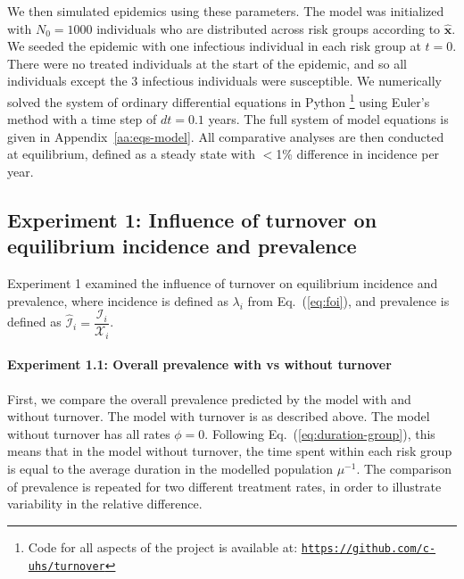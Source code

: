 \par
We then simulated epidemics using these parameters.
The model was initialized with $N_0 = 1000$ individuals
who are distributed across risk groups according to $\bm{\hat{x}}$.
We seeded the epidemic with
one infectious individual in each risk group at $t = 0$.
There were no treated individuals at the start of the epidemic,
and so all individuals except the 3 infectious individuals were susceptible.
We numerically solved the system of ordinary differential equations
in Python%
\footnote{Code for all aspects of the project is available at:
  \href{https://github.com/c-uhs/turnover}{\texttt{https://github.com/c-uhs/turnover}}}
using Euler's method with a time step of $dt = 0.1$ years.
The full system of model equations is given in Appendix~\ref{aa:eqs-model}.
All comparative analyses are then conducted at equilibrium,
defined as a steady state with $<$1\% difference in incidence per year.
\subsection{Experiment 1: Influence of turnover on equilibrium incidence and prevalence}
\label{ss:exp-1}
Experiment 1 examined the influence of turnover on
equilibrium incidence and prevalence, where
incidence is defined as $\lambda_i$ from Eq.~(\ref{eq:foi}), and
prevalence is defined as $\hat{\mathcal{I}}_i = \dfrac{\mathcal{I}_i}{\mathcal{X}_i}$.
\paragraph{Experiment 1.1: Overall prevalence with vs without turnover}
\label{p:exp-turnover-simple}
First, we compare the overall prevalence predicted by the model with and without turnover.
The model with turnover is as described above.
The model without turnover has all rates $\phi = 0$.
Following Eq.~(\ref{eq:duration-group}),
this means that in the model without turnover,
the time spent within each risk group is equal to
the average duration in the modelled population $\mu^{-1}$.
The comparison of prevalence is repeated for two different treatment rates,
in order to illustrate variability in the relative difference.

